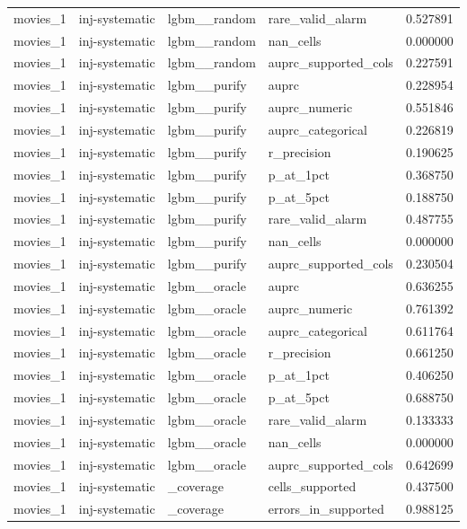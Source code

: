 \begin{tabular}{lllll}
movies\_1 & inj-systematic & lgbm\_\_random & rare\_valid\_alarm & 0.527891 \\
movies\_1 & inj-systematic & lgbm\_\_random & nan\_cells & 0.000000 \\
movies\_1 & inj-systematic & lgbm\_\_random & auprc\_supported\_cols & 0.227591 \\
movies\_1 & inj-systematic & lgbm\_\_purify & auprc & 0.228954 \\
movies\_1 & inj-systematic & lgbm\_\_purify & auprc\_numeric & 0.551846 \\
movies\_1 & inj-systematic & lgbm\_\_purify & auprc\_categorical & 0.226819 \\
movies\_1 & inj-systematic & lgbm\_\_purify & r\_precision & 0.190625 \\
movies\_1 & inj-systematic & lgbm\_\_purify & p\_at\_1pct & 0.368750 \\
movies\_1 & inj-systematic & lgbm\_\_purify & p\_at\_5pct & 0.188750 \\
movies\_1 & inj-systematic & lgbm\_\_purify & rare\_valid\_alarm & 0.487755 \\
movies\_1 & inj-systematic & lgbm\_\_purify & nan\_cells & 0.000000 \\
movies\_1 & inj-systematic & lgbm\_\_purify & auprc\_supported\_cols & 0.230504 \\
movies\_1 & inj-systematic & lgbm\_\_oracle & auprc & 0.636255 \\
movies\_1 & inj-systematic & lgbm\_\_oracle & auprc\_numeric & 0.761392 \\
movies\_1 & inj-systematic & lgbm\_\_oracle & auprc\_categorical & 0.611764 \\
movies\_1 & inj-systematic & lgbm\_\_oracle & r\_precision & 0.661250 \\
movies\_1 & inj-systematic & lgbm\_\_oracle & p\_at\_1pct & 0.406250 \\
movies\_1 & inj-systematic & lgbm\_\_oracle & p\_at\_5pct & 0.688750 \\
movies\_1 & inj-systematic & lgbm\_\_oracle & rare\_valid\_alarm & 0.133333 \\
movies\_1 & inj-systematic & lgbm\_\_oracle & nan\_cells & 0.000000 \\
movies\_1 & inj-systematic & lgbm\_\_oracle & auprc\_supported\_cols & 0.642699 \\
movies\_1 & inj-systematic & \_coverage & cells\_supported & 0.437500 \\
movies\_1 & inj-systematic & \_coverage & errors\_in\_supported & 0.988125 \\

\end{tabular}
